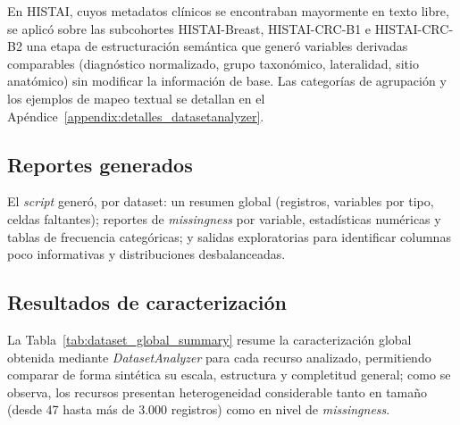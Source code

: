 En HISTAI, cuyos metadatos clínicos se encontraban mayormente en texto libre, se aplicó sobre las subcohortes HISTAI-Breast, HISTAI-CRC-B1 e HISTAI-CRC-B2 una etapa de estructuración semántica que generó variables derivadas comparables (diagnóstico normalizado, grupo taxonómico, lateralidad, sitio anatómico) sin modificar la información de base. Las categorías de agrupación y los ejemplos de mapeo textual se detallan en el Apéndice~\ref{appendix:detalles_datasetanalyzer}.

\subsection{Reportes generados}

El \textit{script} generó, por dataset: un resumen global (registros, variables por tipo, celdas faltantes); reportes de \textit{missingness} por variable, estadísticas numéricas y tablas de frecuencia categóricas; y salidas exploratorias para identificar columnas poco informativas y distribuciones desbalanceadas.

\subsection{Resultados de caracterización}



La Tabla~\ref{tab:dataset_global_summary} resume la caracterización global obtenida mediante \textit{DatasetAnalyzer} para cada recurso analizado, permitiendo comparar de forma sintética su escala, estructura y completitud general; como se observa, los recursos presentan heterogeneidad considerable tanto en tamaño (desde 47 hasta más de 3.000 registros) como en nivel de \textit{missingness}.

